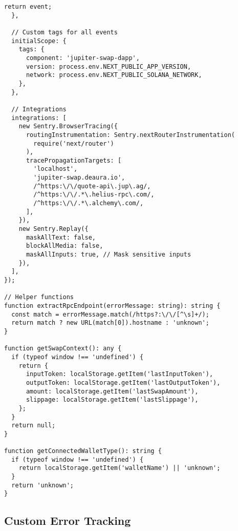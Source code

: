 \documentclass[11pt,a4paper]{article}
\begin{document}
\begin{lstlisting}[style=javascript, caption=Sentry Configuration (sentry.client.config.ts)]
    return event;
  },
  
  // Custom tags for all events
  initialScope: {
    tags: {
      component: 'jupiter-swap-dapp',
      version: process.env.NEXT_PUBLIC_APP_VERSION,
      network: process.env.NEXT_PUBLIC_SOLANA_NETWORK,
    },
  },
  
  // Integrations
  integrations: [
    new Sentry.BrowserTracing({
      routingInstrumentation: Sentry.nextRouterInstrumentation(
        require('next/router')
      ),
      tracePropagationTargets: [
        'localhost',
        'jupiter-swap.deaura.io',
        /^https:\/\/quote-api\.jup\.ag/,
        /^https:\/\/.*\.helius-rpc\.com/,
        /^https:\/\/.*\.alchemy\.com/,
      ],
    }),
    new Sentry.Replay({
      maskAllText: false,
      blockAllMedia: false,
      maskAllInputs: true, // Mask sensitive inputs
    }),
  ],
});

// Helper functions
function extractRpcEndpoint(errorMessage: string): string {
  const match = errorMessage.match(/https?:\/\/[^\s]+/);
  return match ? new URL(match[0]).hostname : 'unknown';
}

function getSwapContext(): any {
  if (typeof window !== 'undefined') {
    return {
      inputToken: localStorage.getItem('lastInputToken'),
      outputToken: localStorage.getItem('lastOutputToken'),
      amount: localStorage.getItem('lastSwapAmount'),
      slippage: localStorage.getItem('lastSlippage'),
    };
  }
  return null;
}

function getConnectedWalletType(): string {
  if (typeof window !== 'undefined') {
    return localStorage.getItem('walletName') || 'unknown';
  }
  return 'unknown';
}
\end{lstlisting}

\subsection{Custom Error Tracking}
\end{document}
